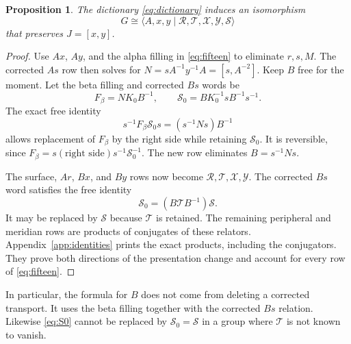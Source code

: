 \documentclass[11pt]{amsart}
\newtheorem{proposition}[theorem]{Proposition}
\theoremstyle{definition}
\theoremstyle{remark}
\begin{document}
\begin{proposition}\label{prop:five}
The dictionary \eqref{eq:dictionary} induces an isomorphism
\[
         G\cong\langle A,x,y\mid
           \mathcal R,\mathcal T,\mathcal X,\mathcal Y,\mathcal S\rangle
\]
that preserves $J=[x,y]$.
\end{proposition}
\begin{proof}
Use $Ax$, $Ay$, and the alpha filling in \eqref{eq:fifteen} to
eliminate $r,s,M$. The corrected $As$ row then solves for
$N=sA^{-1}y^{-1}A=[s,A^{-2}]$. Keep $B$ free for the moment.
Let the beta filling and corrected $Bs$ words be
\[
 F_\beta=NK_0B^{-1},\qquad
 \mathcal S_0=BK_0^{-1}sB^{-1}s^{-1}.
\]
The exact free identity
\begin{equation}\label{eq:beta-elimination}
 s^{-1}F_\beta\mathcal S_0s=(s^{-1}Ns)B^{-1}
\end{equation}
allows replacement of $F_\beta$ by the right side while retaining
$\mathcal S_0$. It is reversible, since
$F_\beta=s(\text{right side})s^{-1}\mathcal S_0^{-1}$.
The new row eliminates $B=s^{-1}Ns$.

The surface, $Ar$, $Bx$, and $By$ rows now become
$\mathcal R,\mathcal T,\mathcal X,\mathcal Y$. The corrected
$Bs$ word satisfies the free identity
\begin{equation}\label{eq:S0}
             \mathcal S_0=(B\mathcal T B^{-1})\mathcal S.
\end{equation}
It may be replaced by $\mathcal S$ because $\mathcal T$ is
retained. The remaining peripheral and meridian rows are products
of conjugates of these relators. Appendix~\ref{app:identities}
prints the exact products, including the conjugators. They prove
both directions of the presentation change and account for every
row of \eqref{eq:fifteen}.
\end{proof}

In particular, the formula for $B$ does not come from deleting a
corrected transport. It uses the beta filling together with the
corrected $Bs$ relation. Likewise \eqref{eq:S0} cannot be replaced
by $\mathcal S_0=\mathcal S$ in a group where $\mathcal T$ is
not known to vanish.
\end{document}
